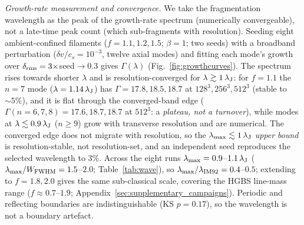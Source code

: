 \documentclass[usenatbib,twoside,twocolumn]{mnras}
\begin{document}
\emph{Growth-rate measurement and convergence.} We take the fragmentation wavelength as the peak of the growth-rate spectrum (numerically convergeable), not a late-time peak count (which sub-fragments with resolution). Seeding eight ambient-confined filaments ($f=1.1,1.2,1.5$; $\beta=1$; two seeds) with a broadband perturbation ($\delta v/c_s=10^{-3}$, twelve axial modes) and fitting each mode's growth over $\delta_{\rm rms}=3\times$seed$\to0.3$ gives $\Gamma(\lambda)$ (Fig.~\ref{fig:growthcurves}). The spectrum rises towards shorter $\lambda$ and is resolution-converged for $\lambda\gtrsim1\,\lambda_{\rm J}$: for $f=1.1$ the $n=7$ mode ($\lambda=1.14\,\lambda_{\rm J}$) has $\Gamma=17.8,18.5,18.7$ at $128^3,256^3,512^3$ (stable to $\sim5\%$), and it is flat through the converged-band edge ($\Gamma(n{=}6,7,8)=17.6,18.7,18.7$ at $512^3$: a \emph{plateau, not a turnover}), while modes at $\lambda\lesssim0.9\,\lambda_{\rm J}$ ($n\geq9$) grow with transverse resolution and are numerical. The converged edge does not migrate with resolution, so the $\lambda_{\rm max}\lesssim1\,\lambda_{\rm J}$ \emph{upper bound} is resolution-stable, not resolution-set, and an independent seed reproduces the selected wavelength to $3\%$. Across the eight runs $\lambda_{\rm max}=0.9$--$1.1\,\lambda_{\rm J}$ ($\lambda_{\rm max}/W_{\rm FWHM}=1.5$--$2.0$; Table~\ref{tab:wave}), so $\lambda_{\rm max}/\lambda_{\rm IM92}=0.4$--$0.5$; extending to $f=1.8,2.0$ gives the same sub-classical scale, covering the HGBS line-mass range ($f\approx0.7$--$1.9$; Appendix~\ref{sec:supplementary_campaigns}). Periodic and reflecting boundaries are indistinguishable (KS $p=0.17$), so the wavelength is not a boundary artefact.
\end{document}
